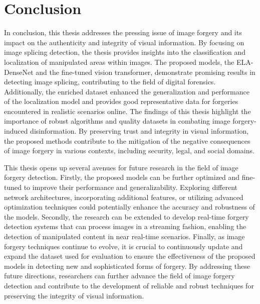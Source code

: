 \chapter{Conclusion}\label{chap:concl}

In conclusion, this thesis addresses the pressing issue of image forgery and its impact on the authenticity and integrity of visual information. By focusing on image splicing detection, the thesis provides insights into the classification and localization of manipulated areas within images. The proposed models, the ELA-DenseNet and the fine-tuned vision transformer, demonstrate promising results in detecting image splicing, contributing to the field of digital forensics. Additionally, the enriched dataset enhanced the generalization and performance of the localization model and provides good representative data for forgeries encountered in realistic scenarios online. The findings of this thesis highlight the importance of robust algorithms and quality datasets in combating image forgery-induced disinformation. By preserving trust and integrity in visual information, the proposed methods contribute to the mitigation of the negative consequences of image forgery in various contexts, including security, legal, and social domains.

This thesis opens up several avenues for future research in the field of image forgery detection. Firstly, the proposed models can be further optimized and fine-tuned to improve their performance and generalizability. Exploring different network architectures, incorporating additional features, or utilizing advanced optimization techniques could potentially enhance the accuracy and robustness of the models. Secondly, the research can be extended to develop real-time forgery detection systems that can process images in a streaming fashion, enabling the detection of manipulated content in near real-time scenarios. Finally, as image forgery techniques continue to evolve, it is crucial to continuously update and expand the dataset used for evaluation to ensure the effectiveness of the proposed models in detecting new and sophisticated forms of forgery. By addressing these future directions, researchers can further advance the field of image forgery detection and contribute to the development of reliable and robust techniques for preserving the integrity of visual information.

